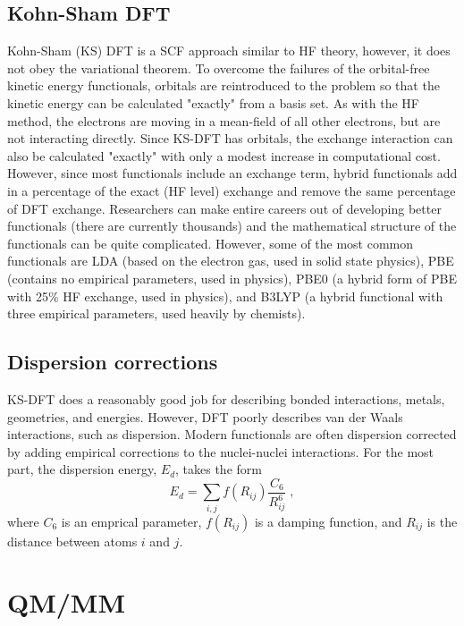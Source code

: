 \documentclass[12pt]{report}
\begin{document}
\subsection{Kohn-Sham DFT}

Kohn-Sham (KS) DFT is a SCF approach similar to HF theory, however, it does
not obey the variational theorem.
To overcome the failures of the orbital-free kinetic energy functionals,
orbitals are reintroduced to the problem so that the kinetic energy can be
calculated "exactly" from a basis set.
As with the HF method, the electrons are moving in a mean-field of all other
electrons, but are not interacting directly.
Since KS-DFT has orbitals, the exchange interaction can also be calculated
"exactly" with only a modest increase in computational cost.
However, since most functionals include an exchange term, hybrid functionals
add in a percentage of the exact (HF level) exchange and remove the same
percentage of DFT exchange.
Researchers can make entire careers out of developing better functionals
(there are currently thousands) and the mathematical structure of the
functionals can be quite complicated.
However, some of the most common functionals are LDA (based on the electron
gas, used in solid state physics), PBE (contains no empirical parameters, used
in physics), PBE0 (a hybrid form of PBE with 25\% HF exchange, used in
physics), and B3LYP (a hybrid functional with three empirical parameters, used
heavily by chemists).

\subsection{Dispersion corrections}

KS-DFT does a reasonably good job for describing bonded interactions, metals,
geometries, and energies.
However, DFT poorly describes van der Waals interactions, such as dispersion.
Modern functionals are often dispersion corrected by adding empirical
corrections to the nuclei-nuclei interactions.
For the most part, the dispersion energy, $E_d$, takes the form
\begin{equation}
 E_d = \sum_{i,j} f(R_{ij})\frac{C_6}{R_{ij}^6} \; ,
\end{equation}
where $C_6$ is an emprical parameter, $f(R_{ij})$ is a damping function, and
$R_{ij}$ is the distance between atoms $i$ and $j$.

\section{QM/MM}
 \label{sec:QMMMSim}
\end{document}
